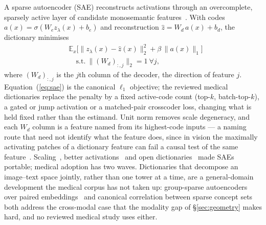A sparse autoencoder (SAE) reconstructs activations through an overcomplete, sparsely active layer of
candidate monosemantic features~\cite{cunningham2023sparse}. With codes
$a(x)=\sigma(W_e z_\lambda(x)+b_e)$ and reconstruction $\hat z=W_d\,a(x)+b_d$, the dictionary
minimises
\begin{equation}
\begin{split}
&\mathbb{E}_x\big[\|z_\lambda(x)-\hat z(x)\|_2^{2}+\beta\,\|a(x)\|_1\big]\\
&\quad\text{s.t.}\ \|(W_d)_{:,j}\|_2=1\ \forall j,
\end{split}
\label{eq:sae}
\end{equation}
where $(W_d)_{:,j}$ is the $j$th column of the decoder, the direction of feature $j$.
Equation~(\ref{eq:sae}) is the canonical $\ell_1$ objective; the reviewed medical dictionaries replace the
penalty by a fixed active-code count (top-$k$, batch-top-$k$), a gated or jump activation or a matched-pair
crosscoder loss, changing what is held fixed rather than the estimand. Unit norm removes scale degeneracy,
and each $W_d$ column is a feature named from its highest-code inputs --- a naming route that need not identify what the feature does, since in vision the maximally activating patches of a dictionary feature can fail a causal test of the same feature~\cite{han2025causal}. Scaling~\cite{gao2024scaling}, better
activations~\cite{rajamanoharan2024jumping} and open dictionaries~\cite{lieberum2024gemma} made SAEs
portable; medical adoption has two waves. Dictionaries that decompose an image--text space jointly, rather than one tower at a time, are a general-domain development the medical corpus has not taken up: group-sparse autoencoders over paired embeddings~\cite{kaushik2026decomposing} and canonical correlation between sparse concept sets~\cite{gordon2026scocca} both address the cross-modal case that the modality gap of \S\ref{sec:geometry} makes hard, and no reviewed medical study uses either.

